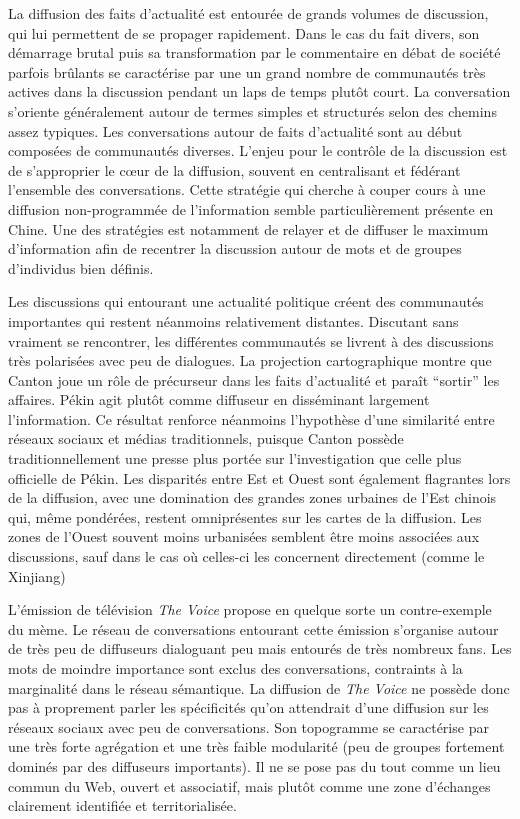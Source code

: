 La diffusion des faits d{\textquoteright}actualité est entourée de grands volumes de discussion, qui lui permettent de se propager rapidement. Dans le cas du fait divers, son démarrage brutal puis sa transformation par le commentaire en débat de société parfois brûlants se caractérise par une un grand nombre de communautés très actives dans la discussion pendant un laps de temps plutôt court. La conversation s'oriente généralement autour de termes simples et structurés selon des chemins assez typiques. Les conversations autour de faits d'actualité sont au début composées de communautés diverses. L'enjeu pour le contrôle de la discussion est de s'approprier le cœur de la diffusion, souvent en centralisant et fédérant l'ensemble des conversations. Cette stratégie qui cherche à couper cours à une diffusion non-programmée de l'information semble particulièrement présente en Chine. Une des stratégies est notamment de relayer et de diffuser le maximum d'information afin de recentrer la discussion autour de mots et de groupes d{\textquoteright}individus bien définis. 

Les discussions qui entourant une actualité politique créent des communautés importantes qui restent néanmoins relativement distantes. Discutant sans vraiment se rencontrer, les différentes communautés se livrent à des discussions très polarisées avec peu de dialogues. La projection cartographique montre que Canton joue un r\^ole de précurseur dans les faits d{\textquoteright}actualité et para\^it {\textquotedblleft}sortir{\textquotedblright} les affaires. Pékin agit plutôt comme diffuseur en disséminant largement l{\textquoteright}information. Ce résultat renforce néanmoins l{\textquoteright}hypothèse d{\textquoteright}une similarité entre réseaux sociaux et médias traditionnels, puisque Canton possède traditionnellement une presse plus portée sur l'investigation que celle plus officielle de Pékin. Les disparités entre Est et Ouest sont également flagrantes lors de la diffusion, avec une domination des grandes zones urbaines de l{\textquoteright}Est chinois qui, même pondérées, restent omniprésentes sur les cartes de la diffusion. Les zones de l{\textquoteright}Ouest souvent moins urbanisées semblent être moins associées aux discussions, sauf dans le cas où celles-ci les concernent directement (comme le Xinjiang) 

L{\textquoteright}émission de télévision \textit{The Voice} propose en quelque sorte un contre-exemple du mème. Le réseau de conversations entourant cette émission s'organise autour de très peu de diffuseurs dialoguant peu mais entourés de très nombreux fans. Les mots de moindre importance sont exclus des conversations, contraints à la marginalité dans le réseau sémantique. La diffusion de \textit{The Voice} ne possède donc pas à proprement parler les spécificités qu'on attendrait d'une diffusion sur les réseaux sociaux avec peu de conversations. Son topogramme se caractérise par une très forte agrégation et une très faible modularité (peu de groupes fortement dominés par des diffuseurs importants). Il ne se pose pas du tout comme un lieu commun du Web, ouvert et associatif,  mais plut\^ot comme une zone d'échanges clairement identifiée et territorialisée. 

